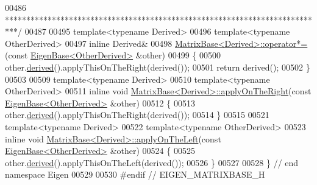 \begin{DoxyCode}
00486 \textcolor{comment}{***************************************************************************/}
00487 
00495 \textcolor{keyword}{template}<\textcolor{keyword}{typename} Derived>
00496 \textcolor{keyword}{template}<\textcolor{keyword}{typename} OtherDerived>
00497 \textcolor{keyword}{inline} Derived&
00498 \hyperlink{group___core___module_a3783b6168995ca117a1c19fea3630ac4}{MatrixBase<Derived>::operator*=}(\textcolor{keyword}{const} 
      \hyperlink{group___core___module_struct_eigen_1_1_eigen_base}{EigenBase<OtherDerived>} &other)
00499 \{
00500   other.\hyperlink{group___core___module_a324b16961a11d2ecfd2d1b7dd7946545}{derived}().applyThisOnTheRight(derived());
00501   \textcolor{keywordflow}{return} derived();
00502 \}
00503 
00509 \textcolor{keyword}{template}<\textcolor{keyword}{typename} Derived>
00510 \textcolor{keyword}{template}<\textcolor{keyword}{typename} OtherDerived>
00511 \textcolor{keyword}{inline} \textcolor{keywordtype}{void} \hyperlink{group___core___module_a45d91752925d2757fc8058a293b15462}{MatrixBase<Derived>::applyOnTheRight}(\textcolor{keyword}{const} 
      \hyperlink{group___core___module_struct_eigen_1_1_eigen_base}{EigenBase<OtherDerived>} &other)
00512 \{
00513   other.\hyperlink{group___core___module_a324b16961a11d2ecfd2d1b7dd7946545}{derived}().applyThisOnTheRight(derived());
00514 \}
00515 
00521 \textcolor{keyword}{template}<\textcolor{keyword}{typename} Derived>
00522 \textcolor{keyword}{template}<\textcolor{keyword}{typename} OtherDerived>
00523 \textcolor{keyword}{inline} \textcolor{keywordtype}{void} \hyperlink{group___core___module_a3a08ad41e81d8ad4a37b5d5c7490e765}{MatrixBase<Derived>::applyOnTheLeft}(\textcolor{keyword}{const} 
      \hyperlink{group___core___module_struct_eigen_1_1_eigen_base}{EigenBase<OtherDerived>} &other)
00524 \{
00525   other.\hyperlink{group___core___module_a324b16961a11d2ecfd2d1b7dd7946545}{derived}().applyThisOnTheLeft(derived());
00526 \}
00527 
00528 \} \textcolor{comment}{// end namespace Eigen}
00529 
00530 \textcolor{preprocessor}{#endif // EIGEN\_MATRIXBASE\_H}
\end{DoxyCode}
